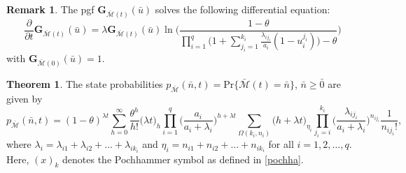 \documentclass[12pt,oneside,reqno]{amsart}
\numberwithin{equation}{section}
\theoremstyle{definition}
\numberwithin{equation}{section}
\newtheorem{theorem}{\bf Theorem}[section]
\newtheorem{remark}{\bf Remark}[section]
\theoremstyle{remarkstyle}
\begin{document}
\begin{remark}
	The pgf  $\mathbf{G}_{\bar{\mathscr{M}}(t)}(\bar{u})$ solves the following differential equation:
	\begin{equation*}
		\frac{\partial}{\partial t}\mathbf{G}_{\bar{\mathscr{M}}(t)}(\bar{u})
		=\lambda \mathbf{G}_{\bar{\mathscr{M}}(t)}(\bar{u})\ln \Bigg(\frac{1-\theta}{ \prod_{i=1}^{q}\big(1+\sum_{j_i=1}^{k_i}\frac{\lambda_{ij_i}}{a_i}(1-u_i^{j_i})\big)-\theta}\Bigg) 
	\end{equation*}
with $\mathbf{G}_{\bar{\mathscr{M}}(0)}(\bar{u})=1$.
\end{remark}



\begin{theorem}\label{state_prob1}
	The state probabilities $p_{\bar{\mathscr{M}}}(\bar{n},t)=\mathrm{Pr}\{\bar{\mathscr{M}}(t)=\bar{n}\}$, $\bar{n}\ge \bar{0}$ are given by
{\footnotesize	\begin{equation}\label{state_pr2}
				p_{\bar{\mathscr{M}}}(\bar{n},t)=(1-\theta)^{\lambda t}\sum_{h=0}^{\infty}\frac{\theta^h}{h!}\big(\lambda t\big)_h \prod_{i=1}^{q}\Big(\frac{a_i}{a_i+\lambda_i}\Big)^{h+\lambda t}\sum_{\Omega(k_i,n_i)}\big(h+\lambda t\big)_{\eta_i}\prod_{j_i=i}^{k_i}\Big(\frac{\lambda_{ij_i}}{a_i+\lambda_i}\Big)^{n_{ij_i}}				
				\frac{1}{n_{ij_i}!},
		\end{equation}}
	where
    $\lambda_i=\lambda_{i1}+\lambda_{i2}+\dots+\lambda_{ik_i}$ and $\eta_i=n_{i1}+n_{i2}+\dots+n_{ik_i}$ for all $i=1,2,\dots,q$. Here, $(x)_k$ denotes the Pochhammer symbol as defined in \eqref{pochha}.
\end{theorem}
\end{document}
